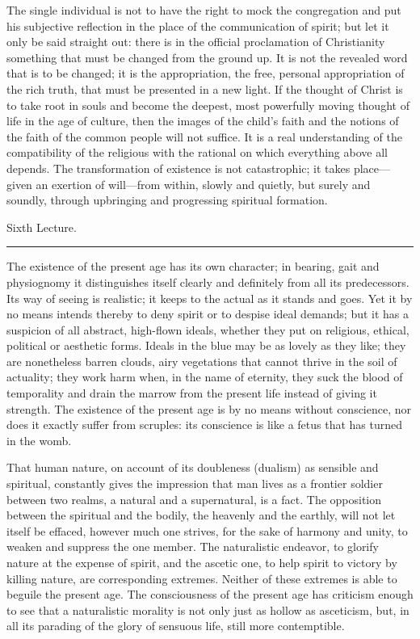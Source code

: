 \documentclass[12pt,a4paper,openany]{book}
\newcommand{\opage}[1]{\marginnote{\footnotesize\textit{[#1]}}}
\newcommand{\lecture}[1]{\clearpage\begin{center}{\large #1}\\[0.4em]\rule{3em}{0.4pt}\end{center}\medskip\noindent}
\begin{document}
The single individual is not to have the right to mock the congregation
and put his subjective reflection in the place of the communication of
spirit; but let it only be said straight out: there is in the official
proclamation of Christianity something that must be changed from the
ground up. It is not the revealed word that is to be changed; it is the
appropriation, the free, personal appropriation of the rich truth, that
must be presented in a new light. If the thought of Christ is to take
root in souls and become the \opage{90}deepest, most powerfully moving thought of
life in the age of culture, then the images of the child's faith and the
notions of the faith of the common people will not suffice. It is a real
understanding of the compatibility of the religious with the rational on
which everything above all depends. The transformation of existence is
not catastrophic; it takes place---given an exertion of will---from
within, slowly and quietly, but surely and soundly, through upbringing and
progressing spiritual formation.

\lecture{Sixth Lecture.}
\opage{91}The existence of the present age has its own character; in bearing, gait
and physiognomy it distinguishes itself clearly and definitely from all
its predecessors. Its way of seeing is realistic; it keeps to the actual
as it stands and goes. Yet it by no means intends thereby to deny spirit
or to despise ideal demands; but it has a suspicion of all abstract,
high-flown ideals, whether they put on religious, ethical, political or
aesthetic forms. Ideals in the blue may be as lovely as they like; they
are nonetheless barren clouds, airy vegetations that cannot thrive in the
soil of actuality; they work harm when, in the name of eternity, they suck
the blood of temporality and drain the marrow from the present life
instead of giving it strength. The existence of the present age is by no
means without conscience, nor does it exactly suffer from scruples: its
conscience is like a fetus that has turned in the womb.

That human nature, on account of its doubleness (dualism) as sensible and
spiritual, constantly gives the impression that man lives as a frontier
soldier between two realms, a natural and a supernatural, is a fact. The
opposition between the spiritual and the \opage{92}bodily, the heavenly and the
earthly, will not let itself be effaced, however much one strives, for
the sake of harmony and unity, to weaken and suppress the one member. The
naturalistic endeavor, to glorify nature at the expense of spirit, and
the ascetic one, to help spirit to victory by killing nature, are
corresponding extremes. Neither of these extremes is able to beguile the
present age. The consciousness of the present age has criticism enough to
see that a naturalistic morality is not only just as hollow as
asceticism, but, in all its parading of the glory of sensuous life, still
more contemptible.
\end{document}
